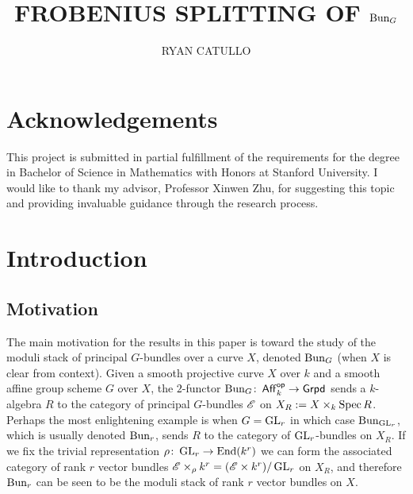 \documentclass[12pt]{article}
\title{\large\bfseries{FROBENIUS SPLITTING OF $\operatorname{Bun}_G$}}
\author{\normalsize{RYAN CATULLO}}
\date{}
\begin{document}
\maketitle
{}

\tableofcontents

\vspace{4em}
\pagestyle{fancy}

\section*{Acknowledgements}
This project is submitted in partial fulfillment of the requirements for the degree in Bachelor of Science in Mathematics with Honors at Stanford University. I would like to thank my advisor, Professor Xinwen Zhu, for suggesting this topic and providing invaluable guidance through the research process.

\section{Introduction}

\subsection{Motivation}
The main motivation for the results in this paper is toward the study of the moduli stack of principal $G$-bundles over a curve $X$, denoted $\operatorname{Bun}_G$ (when $X$ is clear from context). Given a smooth projective curve $X$ over $k$ and a smooth affine group scheme $G$ over $X$, the $2$-functor $\operatorname{Bun}_G \colon \operatorname{\mathsf{Aff}}_k^{\operatorname{\mathsf{op}}} \to \operatorname{\mathsf{Grpd}}$ sends a $k$-algebra $R$ to the category of principal $G$-bundles $\mathscr{E}$ on $X_R := X \times_k \operatorname{Spec} R$. Perhaps the most enlightening example is when $G=\operatorname{GL}_r$ in which case $\operatorname{Bun}_{\operatorname{GL}_r}$, which is usually denoted $\operatorname{Bun}_r$, sends $R$ to the category of $\operatorname{GL}_r$-bundles on $X_R$. If we fix the trivial representation $\rho \colon \operatorname{GL}_r \to \operatorname{End}(k^r)$ we can form the associated category of rank $r$ vector bundles $\mathscr{E} \times_{\rho} k^r = (\mathscr{E} \times k^r)/\operatorname{GL}_r$ on $X_R$, and therefore $\operatorname{Bun}_r$ can be seen to be the moduli stack of rank $r$ vector bundles on $X$.
\end{document}
